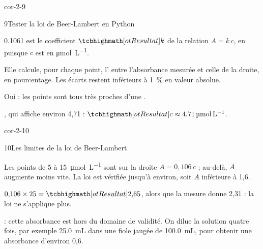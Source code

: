 \begin{blocLivre}{cor-2-9}
\begin{corrige}{9}{Tester la loi de Beer-Lambert en Python}
\begin{questions}
\item 0.1061 est le coefficient $\res{k}$ de la relation $A=k\,c$, en  puisque $c$ est en \unit{\micro mol.L^{-1}}.
\item Elle calcule, pour chaque point, l' entre l'absorbance mesurée et celle de la droite, en pourcentage. Les
écarts restent inférieurs à 1~\% en valeur absolue.
\item Oui : les points sont tous très proches d'une .
\item {}, qui affiche environ 4,71 : $\res{c\approx\qty{4,71}{\micro mol.L^{-1}}}$.
\end{questions}
\end{corrige}
\end{blocLivre}
\begin{blocLivre}{cor-2-10}
\begin{corrige}{10}{Les limites de la loi de Beer-Lambert}
\begin{questions}
\item Les points de 5 à \qty{15}{\micro mol.L^{-1}} sont sur la droite $A=0{,}106\,c$ ; au-delà, $A$ augmente moins vite. La loi est vérifiée
jusqu'à  environ, soit $A$ inférieure à 1,6.
\item $0{,}106\times25=\res{2{,}65}$, alors que la mesure donne 2,31 : la loi ne s'applique plus.
\item {} : cette absorbance est hors du domaine de validité. On dilue la solution quatre fois, par exemple \qty{25,0}{mL}
dans une fiole jaugée de \qty{100,0}{mL}, pour obtenir une absorbance d'environ 0,6.
\end{questions}
\end{corrige}
\end{blocLivre}
